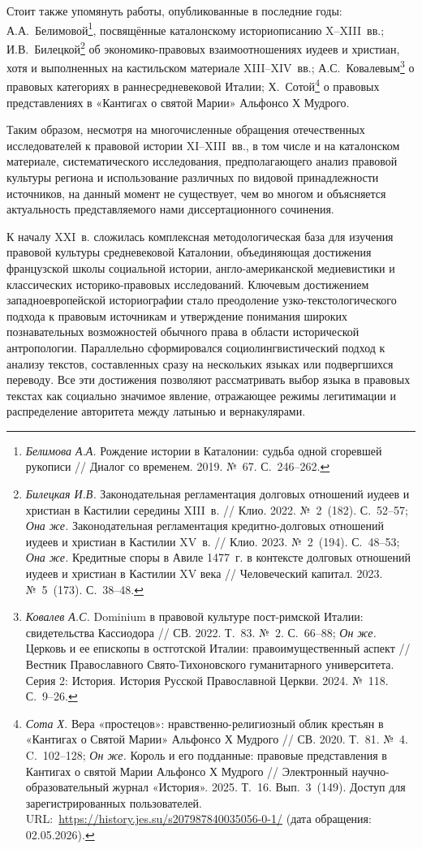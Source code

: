 Стоит также упомянуть работы, опубликованные в последние годы: А.А.~Белимовой\footnote{\emph{Белимова А.А.} Рождение истории в Каталонии: судьба одной сгоревшей рукописи // Диалог со временем. 2019. №~67. С.~246--262.}, посвящённые каталонскому историописанию X--XIII~вв.; И.В.~Билецкой\footnote{\emph{Билецкая И.В.} Законодательная регламентация долговых отношений иудеев и христиан в Кастилии середины XIII~в. // Клио. 2022. №~2~(182). С.~52--57; \emph{Она же.} Законодательная регламентация кредитно-долговых отношений иудеев и христиан в Кастилии XV~в. // Клио. 2023. №~2~(194). С.~48--53; \emph{Она же.} Кредитные споры в Авиле 1477~г. в контексте долговых отношений иудеев и христиан в Кастилии XV века // Человеческий капитал. 2023. №~5~(173). С.~38--48.} об экономико-правовых взаимоотношениях иудеев и христиан, хотя и выполненных на кастильском материале XIII--XIV~вв.; А.С.~Ковалевым\footnote{\emph{Ковалев А.С. }Dominium в правовой культуре пост-римской Италии: свидетельства Кассиодора // СВ. 2022. Т.~83. №~2. С.~66--88; \emph{Он же.} Церковь и ее епископы в остготской Италии: правоимущественный аспект // Вестник Православного Свято-Тихоновского гуманитарного университета. Серия 2: История. История Русской Православной Церкви. 2024. №~118. С.~9--26.} о правовых категориях в раннесредневековой Италии; Х.~Сотой\footnote{\emph{Сота Х.} Вера «простецов»: нравственно-религиозный облик крестьян в «Кантигах о Святой Марии» Альфонсо Х Мудрого // СВ. 2020. Т.~81. №~4. C.~102--128; \emph{Он же.} Король и его подданные: правовые представления в Кантигах о святой Марии Альфонсо Х Мудрого // Электронный научно-образовательный журнал «История». 2025. Т.~16. Вып.~3~(149). Доступ для зарегистрированных пользователей. URL:~\url{https://history.jes.su/s207987840035056-0-1/} (дата обращения: 02.05.2026).} о правовых представлениях в «Кантигах о святой Марии» Альфонсо Х Мудрого.

Таким образом, несмотря на многочисленные обращения отечественных исследователей к правовой истории XI--XIII~вв., в том числе и на каталонском материале, систематического исследования, предполагающего анализ правовой культуры региона и использование различных по видовой принадлежности источников, на данный момент не существует, чем во многом и объясняется актуальность представляемого нами диссертационного сочинения.

К началу XXI~в. сложилась комплексная методологическая база для изучения правовой культуры средневековой Каталонии, объединяющая достижения французской школы социальной истории, англо-американской медиевистики и классических историко-правовых исследований. Ключевым достижением западноевропейской историографии стало преодоление узко-текстологического подхода к правовым источникам и утверждение понимания широких познавательных возможностей обычного права в области исторической антропологии. Параллельно сформировался социолингвистический подход к анализу текстов, составленных сразу на нескольких языках или подвергшихся переводу. Все эти достижения позволяют рассматривать выбор языка в правовых текстах как социально значимое явление, отражающее режимы легитимации и распределение авторитета между латынью и вернакулярами.
